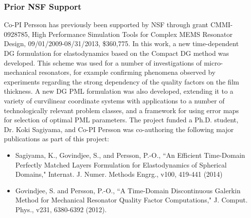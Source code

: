 \documentclass[11pt]{article}
\begin{document}

\subsubsection{Prior NSF Support}

Co-PI Persson has previously been supported by NSF through grant CMMI-0928785,
High Performance Simulation Tools for Complex MEMS Resonator Design,
09/01/2009-08/31/2013, \$360,775. In this work, a new time-dependent DG
formulation for elastodynamics based on the Compact DG method was
developed. This scheme was used for a number of investigations of
micro-mechanical resonators, for example confirming phenomena observed by
experiments regarding the strong dependency of the quality factors on the film
thickness. A new DG PML formulation was also developed, extending it to a
variety of curvilinear coordinate systems with applications to a number of
technologically relevant problem classes, and a framework for using error maps
for selection of optimal PML parameters.  The project funded a Ph.D. student,
Dr. Koki Sagiyama, and Co-PI Persson was co-authoring the following major
publications as part of this project:
\begin{itemize}
\item Sagiyama, K., Govindjee, S., and Persson, P.-O., ``An Efficient Time-Domain Perfectly Matched Layers Formulation for Elastodynamics of Spherical Domains," Internat. J. Numer. Methods Engrg., v100, 419-441 (2014)
\item Govindjee, S. and Persson, P.-O., ``A Time-Domain Discontinuous Galerkin Method for Mechanical Resonator Quality Factor Computations," J. Comput. Phys., v231, 6380-6392 (2012).
\end{itemize}

%

{\vbox{}}
\end{document}
